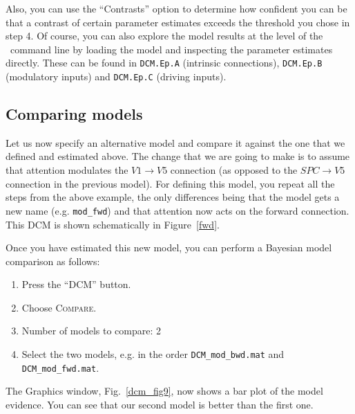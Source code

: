 Also, you can use the ``Contrasts'' option to determine how confident you can be that a contrast of certain parameter estimates exceeds the threshold you chose in step 4.
Of course, you can also explore the model results at the level of the \matlab\ command line by loading the model and inspecting the parameter estimates directly. These can be found in \texttt{DCM.Ep.A} (intrinsic connections), \texttt{DCM.Ep.B} (modulatory inputs) and \texttt{DCM.Ep.C} (driving inputs).

\subsection{Comparing models}

Let us now specify an alternative model and compare it against the one that we defined and estimated above. The change that we are going to make is to assume that attention modulates the $V1 \rightarrow V5$ connection (as opposed to the $SPC \rightarrow V5$ connection in the previous model). For defining this model, you repeat all the steps from the above example, the only differences being that the model gets a new name (e.g. \verb!mod_fwd!) and that attention now acts on the forward connection. This DCM is shown schematically in Figure~\ref{fwd}.

Once you have estimated this new model, you can perform a Bayesian model comparison as follows:
\begin{enumerate}
 \item Press the ``DCM'' button.
 \item Choose \textsc{Compare}.
 \item Number of models to compare: 2
 \item Select the two models, e.g. in the order \texttt{DCM\_mod\_bwd.mat} and \texttt{DCM\_mod\_fwd.mat}.
\end{enumerate}

The Graphics window, Fig.~\ref{dcm_fig9}, now shows a bar plot of the model evidence. You can see that our second model is better than the first one.

